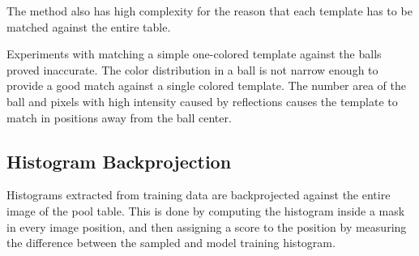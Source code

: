 The method also has high complexity for the reason that each template has to be matched against the entire table.

Experiments with matching a simple one-colored template against the balls proved inaccurate. The color distribution in a ball is not narrow enough to provide a good match against a single colored template. The number area of the ball and pixels with high intensity caused by reflections causes the template to match in positions away from the ball center.

\subsection{Histogram Backprojection}
Histograms extracted from training data are backprojected against the entire image of the pool table. This is done by computing the histogram inside a mask in every image position, and then assigning a score to the position by measuring the difference between the sampled and model training histogram.\cite{learningOpenCV}

